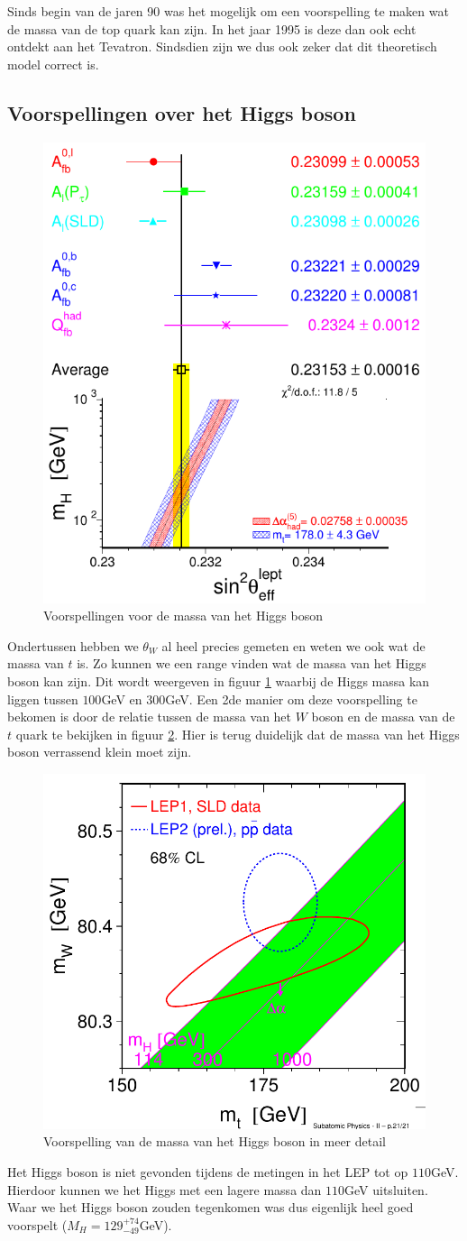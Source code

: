 \documentclass[../main.tex]{subfiles}
\begin{document}
Sinds begin van de jaren 90 was het mogelijk om een voorspelling te maken wat de massa van de top quark kan zijn. In het jaar 1995 is deze dan ook echt ontdekt aan het Tevatron. Sindsdien zijn we dus ook zeker dat dit theoretisch model correct is.

\subsection{Voorspellingen over het Higgs boson}%
\label{sub:voorspellingen_over_het_higgs_boson}

\begin{figure}[h]
    \centering
    \includegraphics[width=0.5\linewidth]{elektroweak_precision_tests/h_massa_voorspelling.png}
    \caption{Voorspellingen voor de massa van het Higgs boson}%
    \label{fig:elektroweak_precision_tests/h_massa_voorspelling}
\end{figure}
Ondertussen hebben we $\theta_W$ al heel precies gemeten en weten we ook wat de massa van $t$ is. Zo kunnen we een range vinden wat de massa van het Higgs boson kan zijn. Dit wordt weergeven in figuur \ref{fig:elektroweak_precision_tests/h_massa_voorspelling} waarbij de Higgs massa kan liggen tussen $100$GeV en $300$GeV. Een 2de manier om deze voorspelling te bekomen is door de relatie tussen de massa van het $W$ boson en de massa van de $t$ quark te bekijken in figuur \ref{fig:elektroweak_precision_tests/h_massa_voorspelling_2}. Hier is terug duidelijk dat de massa van het Higgs boson verrassend klein moet zijn.

\begin{figure}[h]
    \centering
    \includegraphics[width=0.4\linewidth]{elektroweak_precision_tests/h_massa_voorspelling_2.png}
    \caption{Voorspelling van de massa van het Higgs boson in meer detail}%
    \label{fig:elektroweak_precision_tests/h_massa_voorspelling_2}
\end{figure}

Het Higgs boson is niet gevonden tijdens de metingen in het LEP tot op $110$GeV. Hierdoor kunnen we het Higgs met een lagere massa dan $110$GeV uitsluiten. Waar we het Higgs boson zouden tegenkomen was dus eigenlijk heel goed voorspelt ($M_H = 129_{-49}^{+74}$GeV).
\end{document}
